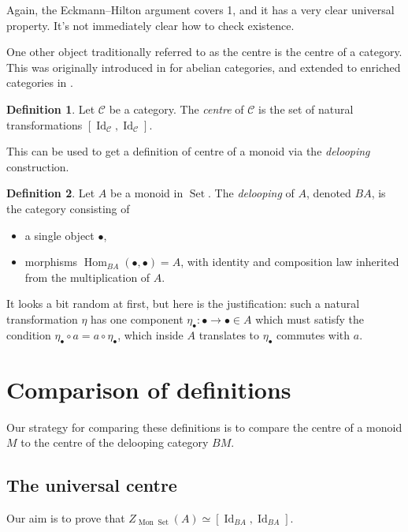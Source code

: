 \documentclass{article}
\newcommand{\C}{\mathcal{C}}
\DeclareMathOperator{\Hom}{Hom}
\DeclareMathOperator{\Id}{Id}
\DeclareMathOperator{\Mon}{Mon}
\DeclareMathOperator{\Set}{Set}
\theoremstyle{definition}
\newtheorem{definition}{Definition}
\begin{document}
Again, the Eckmann--Hilton argument covers 1, and it has a very clear universal property.
It's not immediately clear how to check existence.

One other object traditionally referred to as the centre is the centre of a category.
This was originally introduced in \cite{butler-horrocks} for abelian categories, and extended to enriched categories in \cite{lindner}.

\begin{definition}
  Let $\C$ be a category.
  The \textit{centre} of $\C$ is the set of natural transformations $[\Id_\C, \Id_\C]$.
\end{definition}

This can be used to get a definition of centre of a monoid via the \textit{delooping} construction.

\begin{definition}
  Let $A$ be a monoid in $\Set$.
  The \textit{delooping} of $A$, denoted $BA$, is the category consisting of
  \begin{itemize}
    \item a single object $\bullet$,
    \item morphisms $\Hom_{BA}(\bullet, \bullet) = A$, with identity and composition law inherited from the multiplication of $A$.
  \end{itemize}
\end{definition}

It looks a bit random at first, but here is the justification: such a natural transformation $\eta$ has one component $\eta_\bullet : \bullet \to \bullet \in A$ which must satisfy the condition $\eta_\bullet \circ a = a \circ \eta_\bullet$, which inside $A$ translates to $\eta_\bullet$ commutes with $a$.

\section{Comparison of definitions}
Our strategy for comparing these definitions is to compare the centre of a monoid $M$ to the centre of the delooping category $BM$.

\subsection{The universal centre}
Our aim is to prove that $Z_{\Mon \Set}(A) \simeq [\Id_{BA}, \Id_{BA}]$.
\end{document}
